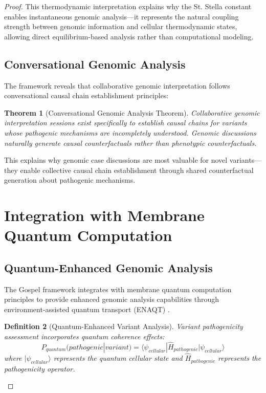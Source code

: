 \documentclass[12pt,a4paper]{article}
\newtheorem{theorem}{Theorem}[section]
\newtheorem{definition}[theorem]{Definition}
\begin{document}
\begin{proof}
This thermodynamic interpretation explains why the St. Stella constant enables instantaneous genomic analysis—it represents the natural coupling strength between genomic information and cellular thermodynamic states, allowing direct equilibrium-based analysis rather than computational modeling.

\subsection{Conversational Genomic Analysis}

The framework reveals that collaborative genomic interpretation follows conversational causal chain establishment principles:

\begin{theorem}[Conversational Genomic Analysis Theorem]
Collaborative genomic interpretation sessions exist specifically to establish causal chains for variants whose pathogenic mechanisms are incompletely understood. Genomic discussions naturally generate causal counterfactuals rather than phenotypic counterfactuals.
\end{theorem}

This explains why genomic case discussions are most valuable for novel variants—they enable collective causal chain establishment through shared counterfactual generation about pathogenic mechanisms.

\section{Integration with Membrane Quantum Computation}

\subsection{Quantum-Enhanced Genomic Analysis}

The Gospel framework integrates with membrane quantum computation principles to provide enhanced genomic analysis capabilities through environment-assisted quantum transport (ENAQT) \cite{lambert2013quantum, engel2007evidence}.

\begin{definition}[Quantum-Enhanced Variant Analysis]
Variant pathogenicity assessment incorporates quantum coherence effects:
\begin{equation}
P_{quantum}(pathogenic|variant) = \langle\psi_{cellular}|\hat{H}_{pathogenic}|\psi_{cellular}\rangle
\end{equation}
where $|\psi_{cellular}\rangle$ represents the quantum cellular state and $\hat{H}_{pathogenic}$ represents the pathogenicity operator.
\end{definition}


\end{proof}
\end{document}
